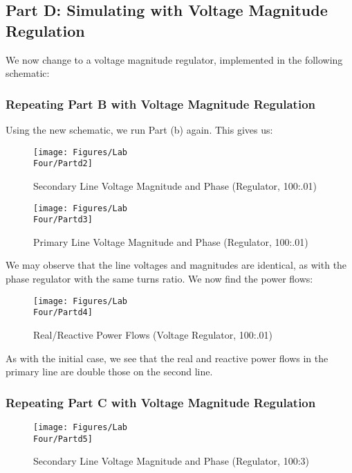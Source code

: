 \documentclass[
	letterpaper, %
	10pt, %
]{CSUniSchoolLabReport}
\begin{document}
\subsection{Part D: Simulating with Voltage Magnitude Regulation}

We now change to a voltage magnitude regulator, implemented in the following schematic:

\subsubsection{Repeating Part B with Voltage Magnitude Regulation}

Using the new schematic, we run Part (b) again. This gives us:

\begin{figure}[H]
  \centering
  \texttt{[image: Figures/Lab\\ Four/Partd2]}
  \caption{Secondary Line Voltage Magnitude and Phase (Regulator, 100:.01)}
  \label{fig:2}
\end{figure}

\begin{figure}[H]
  \centering
  \texttt{[image: Figures/Lab\\ Four/Partd3]}
  \caption{Primary Line Voltage Magnitude and Phase (Regulator, 100:.01)}
  \label{fig:3}
\end{figure}

We may observe that the line voltages and magnitudes are identical, as with the phase regulator with the same turns ratio. We now find the power flows:

\begin{figure}[H]
  \centering
  \texttt{[image: Figures/Lab\\ Four/Partd4]}
  \caption{Real/Reactive Power Flows (Voltage Regulator, 100:.01)}
  \label{fig:4}
\end{figure}

As with the initial case, we see that the real and reactive power flows in the primary line are double those on the second line.

\subsubsection{Repeating Part C with Voltage Magnitude Regulation}

\begin{figure}[H]
  \centering
  \texttt{[image: Figures/Lab\\ Four/Partd5]}
  \caption{Secondary Line Voltage Magnitude and Phase (Regulator, 100:3)}
  \label{fig:5}
\end{figure}
\end{document}
